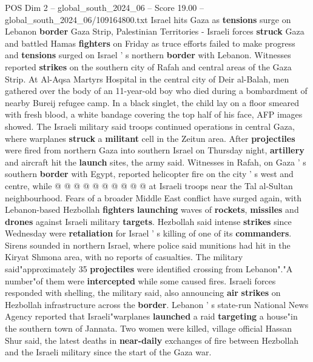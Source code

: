 \begin{textsample}{POS Dim 2 – global\_south\_2024\_06 – Score 19.00 – global\_south\_2024\_06/109164800.txt}  \label{ex:f2_pos_120}
Israel hits Gaza as \textbf{tensions} surge on Lebanon \textbf{border} Gaza Strip, Palestinian Territories - Israeli forces \textbf{struck} Gaza and battled Hamas \textbf{fighters} on Friday as truce efforts failed to make progress and \textbf{tensions} surged on Israel ' s northern \textbf{border} with Lebanon.
Witnesses reported \textbf{strikes} on the southern city of Rafah and central areas of the Gaza Strip.
At Al-Aqsa Martyrs Hospital in the central city of Deir al-Balah, men gathered over the body of an 11-year-old boy who died during a bombardment of nearby Bureij refugee camp.
In a black singlet, the child lay on a floor smeared with fresh blood, a white bandage covering the top half of his face, AFP images showed.
The Israeli military said troops continued operations in central Gaza, where warplanes \textbf{struck} a \textbf{militant} cell in the Zeitun area.
After \textbf{projectiles} were fired from northern Gaza into southern Israel on Thursday night, \textbf{artillery} and aircraft hit the \textbf{launch} sites, the army said.
Witnesses in Rafah, on Gaza ' s southern \textbf{border} with Egypt, reported helicopter fire on the city ' s west and centre, while @ @ @ @ @ @ @ @ @ @ at Israeli troops near the Tal al-Sultan neighbourhood.
Fears of a broader Middle East conflict have surged again, with Lebanon-based Hezbollah \textbf{fighters} \textbf{launching} waves of \textbf{rockets}, \textbf{missiles} and \textbf{drones} against Israeli military \textbf{targets}.
Hezbollah said intense \textbf{strikes} since Wednesday were \textbf{retaliation} for Israel ' s killing of one of its \textbf{commanders}.
Sirens sounded in northern Israel, where police said munitions had hit in the Kiryat Shmona area, with no reports of casualties.
The military said"approximately 35 \textbf{projectiles} were identified crossing from Lebanon"."A number"of them were \textbf{intercepted} while some caused fires.
Israeli forces responded with shelling, the military said, also announcing \textbf{air} \textbf{strikes} on Hezbollah infrastructure across the \textbf{border}.
Lebanon ' s state-run National News Agency reported that Israeli"warplanes \textbf{launched} a raid \textbf{targeting} a house"in the southern town of Jannata.
Two women were killed, village official Hassan Shur said, the latest deaths in \textbf{near-daily} exchanges of fire between Hezbollah and the Israeli military since the start of the Gaza war.

\end{textsample}
